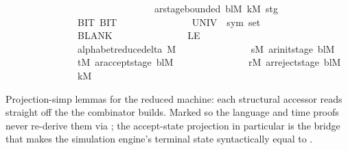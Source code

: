 \begin{isabellebody}
\ \ \ \ \ \ \ \ \ \ \ \ \ \ \ \ \ \ \ \ \ \ \ \ \ \ \ \ \ \ {\isasymand}\ ar{\isacharunderscore}{\kern0pt}stage{\isacharunderscore}{\kern0pt}bounded\ bl{\isacharunderscore}{\kern0pt}M\ k{\isacharunderscore}{\kern0pt}M\ stg{\isacharbraceright}{\kern0pt}{\isacharparenright}{\kern0pt}\isanewline
\ \ \ \ \ \ \ \ \ \ \ \ \ \ \ {\isacharbraceleft}{\kern0pt}BIT{}{\isacharcomma}{\kern0pt}\ BIT{}{\isacharbraceright}{\kern0pt}\isanewline
\ \ \ \ \ \ \ \ \ \ \ \ \ \ \ {\isacharparenleft}{\kern0pt}UNIV\ {\isacharcolon}{\kern0pt}{\isacharcolon}{\kern0pt}\ sym{}\ set{\isacharparenright}{\kern0pt}\isanewline
\ \ \ \ \ \ \ \ \ \ \ \ \ \ \ BLANK{}\isanewline
\ \ \ \ \ \ \ \ \ \ \ \ \ \ \ LE{}\isanewline
\ \ \ \ \ \ \ \ \ \ \ \ \ \ \ {\isacharparenleft}{\kern0pt}alphabet{\isacharunderscore}{\kern0pt}reduce{\isacharunderscore}{\kern0pt}delta\ M{\isacharparenright}{\kern0pt}\isanewline
\ \ \ \ \ \ \ \ \ \ \ \ \ \ \ {\isacharparenleft}{\kern0pt}s{\isacharunderscore}{\kern0pt}M{\isacharcomma}{\kern0pt}\ ar{\isacharunderscore}{\kern0pt}init{\isacharunderscore}{\kern0pt}stage\ bl{\isacharunderscore}{\kern0pt}M{\isacharparenright}{\kern0pt}\isanewline
\ \ \ \ \ \ \ \ \ \ \ \ \ \ \ {\isacharparenleft}{\kern0pt}t{\isacharunderscore}{\kern0pt}M{\isacharcomma}{\kern0pt}\ ar{\isacharunderscore}{\kern0pt}accept{\isacharunderscore}{\kern0pt}stage\ bl{\isacharunderscore}{\kern0pt}M{\isacharparenright}{\kern0pt}\isanewline
\ \ \ \ \ \ \ \ \ \ \ \ \ \ \ {\isacharparenleft}{\kern0pt}r{\isacharunderscore}{\kern0pt}M{\isacharcomma}{\kern0pt}\ ar{\isacharunderscore}{\kern0pt}reject{\isacharunderscore}{\kern0pt}stage\ bl{\isacharunderscore}{\kern0pt}M{\isacharparenright}{\kern0pt}\isanewline
\ \ \ \ \ \ \ \ \ \ \ \ \ \ \ k{\isacharunderscore}{\kern0pt}M{\isacharparenright}{\kern0pt}{\isachardoublequoteclose}%
\begin{isamarkuptext}%
Projection-simp lemmas for the reduced machine: each
  structural accessor reads straight off the  the
  combinator builds.  Marked  so the language and
  time proofs never re-derive them via ; the
  accept-state projection in particular is the bridge that makes
  the simulation engine's terminal state syntactically equal to
  .%
\end{isamarkuptext}\isamarkuptrue%
\isamarkupfalse%

\end{isabellebody}

